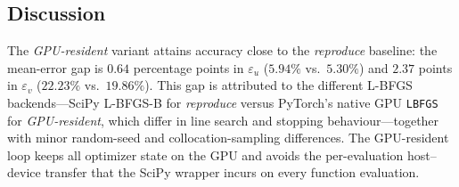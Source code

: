\begin{table}[t]
  \caption{Per-snapshot $L_2$ relative error (\%) for $u$, $v$, and
           spatially demeaned $p$, $Re=10$.  \emph{reproduce} is the
           SciPy L-BFGS-B baseline; \emph{GPU-resident} is the PyTorch
           L-BFGS run.  Selected snapshots shown; best per column in bold.}
  \label{tab:l2_snapshots}
  \centering
\end{table}

\subsection{Discussion}

The \emph{GPU-resident} variant attains accuracy close to the
\emph{reproduce} baseline: the mean-error gap is $0.64$ percentage points in
$\varepsilon_u$ ($5.94\%$ vs.\ $5.30\%$) and $2.37$ points in
$\varepsilon_v$ ($22.23\%$ vs.\ $19.86\%$).  This gap is attributed to the
different L-BFGS backends---SciPy L-BFGS-B for \emph{reproduce}
versus PyTorch's native GPU \texttt{LBFGS} for \emph{GPU-resident}, which differ
in line search and stopping behaviour---together with minor random-seed
and collocation-sampling differences.  The GPU-resident loop keeps all
optimizer state on the GPU and avoids the per-evaluation host--device
transfer that the SciPy wrapper incurs on every function evaluation.

